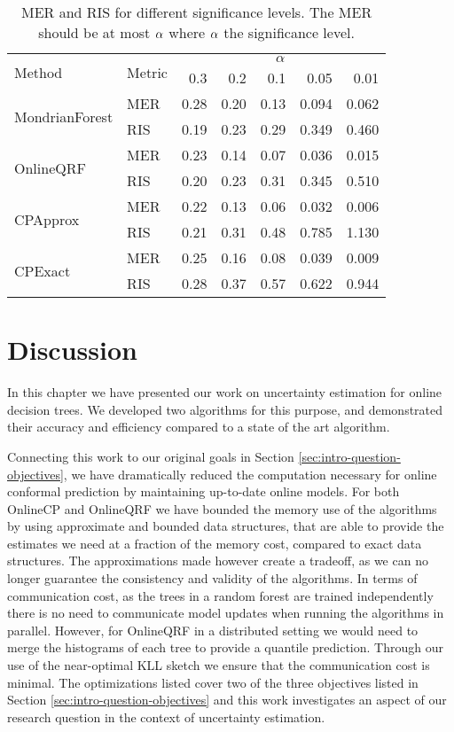 \begin{table}
	\centering
	\begin{tabular}{ll r r r r r}
		\toprule
		\multirow{2}{*}{Method} &  \multirow{2}{*}{Metric} &  \multicolumn{5}{c}{$\alpha$} \\
		\cmidrule(lr){3-7}
		& & 0.3 &   0.2 &   0.1 &   0.05 &   0.01 \\
		\midrule
		\multirow{2}{*}{MondrianForest}   & MER  & 0.28 & 0.20 & 0.13 &  0.094 &  0.062 \\
		& RIS  &  0.19 &  0.23 &  0.29 &   0.349 &   0.460 \\
		\midrule
		\multirow{2}{*}{OnlineQRF} & MER & 0.23 & 0.14 & 0.07 &  0.036 &  0.015 \\
		& RIS &  0.20 &  0.23 &  0.31 &   0.345 &   0.510 \\
		\midrule
		\multirow{2}{*}{CPApprox} & MER  & 0.22 & 0.13 & 0.06 &  0.032 &  0.006 \\
		& RIS &   0.21 &   0.31 &   0.48 &   0.785 &    1.130 \\
		\midrule
		\multirow{2}{*}{CPExact} & MER  & 0.25 & 0.16 & 0.08 &  0.039 &  0.009 \\
		& RIS &   0.28 &   0.37 &   0.57 &   0.622 &   0.944 \\
		\bottomrule
	\end{tabular}
	\caption{MER and RIS for different significance levels. The MER should be at most
		$\alpha$ where $\alpha$ the significance level.}
	\label{tab:uncertain-significance}
\end{table}

\section{Discussion}
\label{sec:uncertain-trees-discussion}

In this chapter we have presented our work on uncertainty estimation for
online decision trees. We developed two algorithms for this purpose,
and demonstrated their accuracy and efficiency compared to a state
of the art algorithm.

Connecting this work to our original goals in Section \ref{sec:intro-question-objectives},
we have dramatically reduced the computation necessary for online conformal
prediction by maintaining up-to-date online models. For both OnlineCP and
OnlineQRF we have bounded the memory use of the algorithms by using approximate
and bounded data structures, that are able to provide the estimates we need
at a fraction of the memory cost, compared to exact data structures.
The approximations made however create a tradeoff,
as we can no longer guarantee the consistency and validity of the algorithms.
In terms of communication cost, as the trees in a random forest are trained independently there is no
need to communicate model updates when running the algorithms in parallel.
However, for OnlineQRF in a distributed setting we would need to merge the histograms of each tree to provide
a quantile prediction. Through our use of the near-optimal KLL sketch we ensure
that the communication cost is minimal.
The optimizations listed cover two of the three objectives
listed in Section \ref{sec:intro-question-objectives} and this work investigates
an aspect of our research question in the context of uncertainty estimation.